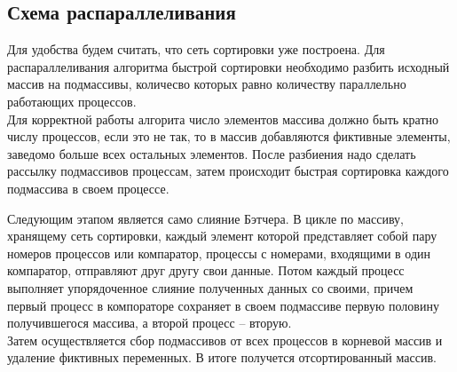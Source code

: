 \documentclass[a4paper]{report}
\begin{document}
\begin{center}
\section*{Схема распараллеливания}
\end{center}
\par Для удобства будем считать, что сеть сортировки уже построена. Для распараллеливания алгоритма быстрой сортировки необходимо разбить исходный массив на подмассивы, количесво которых равно количеству параллельно работающих процессов.\\
Для корректной работы алгорита число элементов массива должно быть кратно числу процессов, если это не так, то в массив добавляются фиктивные элементы, заведомо больше всех остальных элементов. После разбиения надо сделать рассылку подмассивов процессам, затем происходит быстрая сортировка каждого подмассива в своем процессе.\\
\par Следующим этапом является само слияние Бэтчера. В цикле по массиву, хранящему сеть сортировки, каждый элемент которой представляет собой пару номеров процессов или компаратор, процессы с номерами, входящими в один компаратор, отправляют друг другу свои данные. Потом каждый процесс выполняет упорядоченное слияние полученных данных со своими, причем первый процесс в компораторе сохраняет в своем подмассиве первую половину получившегося массива, а второй процесс – вторую.\\
Затем осуществляется сбор подмассивов от всех процессов в корневой массив и удаление фиктивных переменных. В итоге получется отсортированный массив.
\newpage
\end{document}

